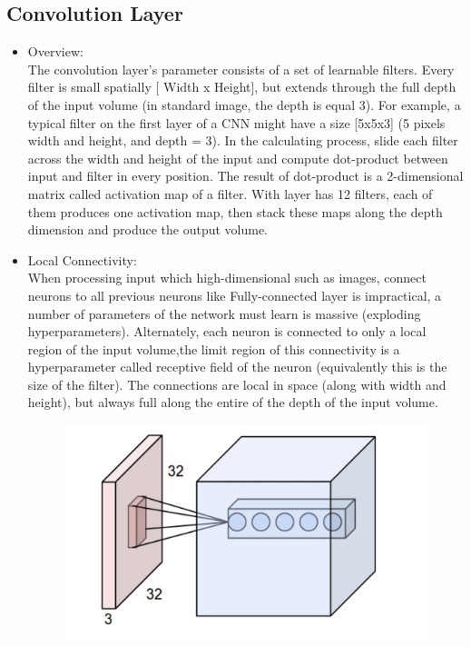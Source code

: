 \vspace{-1cm}
\subsection{Convolution Layer}
\begin{itemize}
	\item Overview:\\ 
	The convolution layer's parameter consists of a set of learnable filters. Every filter is small spatially [ Width x Height], but extends through the full depth of the input volume (in standard image, the depth is equal 3). For example, a typical filter on the first layer of a CNN might have a size [5x5x3] (5 pixels width and height, and depth = 3). In the calculating process, slide each filter across the width and height of the input and compute dot-product between input and filter in every position. The result of dot-product is a 2-dimensional matrix called activation map of a filter. With layer has 12 filters, each of them produces one activation map, then stack these maps along the depth dimension and produce the output volume.
	\item Local Connectivity:\\
	When processing input which high-dimensional such as images, connect neurons to all previous neurons like Fully-connected layer is impractical, a number of parameters of the network must learn is massive (exploding hyperparameters). Alternately, each neuron is connected to only a local region of the input volume,the limit region of this connectivity is a hyperparameter called receptive field of the neuron (equivalently this is the size of the filter). The connections are local in space (along with width and height), but always full along the entire of the depth of the input volume.
	\begin{center}
		\begin{figure}[H]
			\centering
			\includegraphics[width=1\columnwidth]{images/chap2/LocalConnectivity.png}

\end{figure}
\end{center}
\end{itemize}
